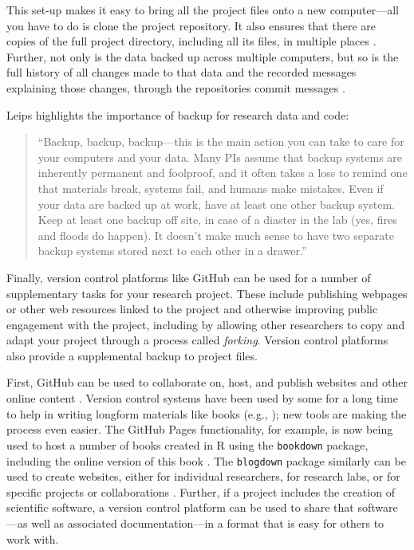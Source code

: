 \documentclass[]{tufte-book}
\begin{document}
This set-up makes it easy to bring all the project files onto a new
computer---all you have to do is clone the project repository. It also ensures
that there are copies of the full project directory, including all its files, in
multiple places \citep{blischak2016quick}. Further, not only is the data backed up
across multiple computers, but so is the full history of all changes made to
that data and the recorded messages explaining those changes, through the
repositories commit messages \citep{perez2016ten}.

Leips highlights the importance of backup for research data and code:

\begin{quote}
``Backup, backup, backup---this is the main action you can take to care for your
computers and your data. Many PIs assume that backup systems are inherently
permanent and foolproof, and it often takes a loss to remind one that
materials break, systems fail, and humans make mistakes. Even if your data
are backed up at work, have at least one other backup system. Keep at least
one backup off site, in case of a diaster in the lab (yes, fires and floods
do happen). It doesn't make much sense to have two separate backup systems stored
next to each other in a drawer.'' \citep{leips2010helm}
\end{quote}

Finally, version control platforms like GitHub can be used for a number
of supplementary tasks for your research project. These include publishing
webpages or other web resources linked to the project and otherwise improving
public engagement with the project, including by allowing other researchers
to copy and adapt your project through a process called \emph{forking}. Version
control platforms also provide a supplemental backup to project files.

First, GitHub can be used to collaborate on, host, and publish websites and
other online content \citep{perez2016ten}. Version control systems have been used by
some for a long time to help in writing longform materials like books (e.g.,
\citet{raymond2003art}); new tools are making the process even easier. The GitHub Pages
functionality, for example, is now being used to host a number of books created
in R using the \texttt{bookdown} package, including the online version of this book
\citep{bookdown}. The \texttt{blogdown} package similarly can be used to create websites,
either for individual researchers, for research labs, or for specific projects
or collaborations \citep{blogdown}. Further, if a project includes the creation of
scientific software, a version control platform can be used to share that
software---as well as associated documentation---in a format that is easy for
others to work with.
\end{document}
